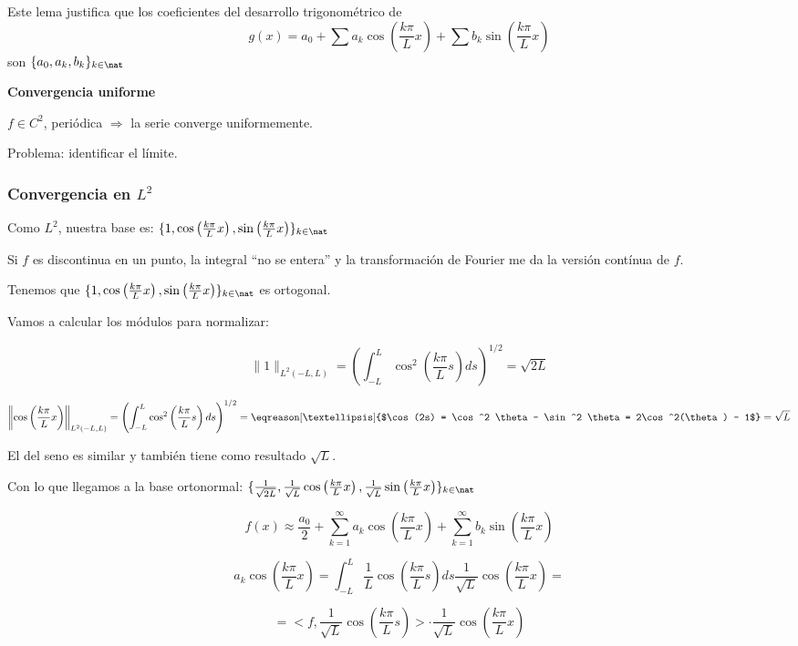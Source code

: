 		Este lema justifica que los coeficientes del desarrollo trigonométrico de$$g(x) = a_0 + \sum a_k \cos \left( \frac{k \pi}{L} x \right) + \sum b_k \sin \left( \frac{k \pi}{L} x \right) $$ son $\{a_0,a_k,b_k\}_{k \in \nat}$

		\textbf{Convergencia uniforme}

		$f \in C^2$, periódica $\Rightarrow$ la serie converge uniformemente.

		Problema: identificar el límite.

		\subsubsection{Convergencia en $L^2$}

		Como $L^2$, nuestra base es: $\{1, \cos \left( \frac{k \pi}{L} x \right), \sin \left( \frac{k \pi}{L} x \right)\}_{k \in \nat}$

		\obs Si $f$ es discontinua en un punto, la integral ``no se entera'' y la transformación de Fourier me da la versión contínua de $f$.

		Tenemos que $\{1, \cos \left( \frac{k \pi}{L} x \right), \sin \left( \frac{k \pi}{L} x \right)\}_{k \in \nat}$ es ortogonal.

		Vamos a calcular los módulos para normalizar:

		\[\|1\|_{L^2 (-L,L)} = \left( \int_{-L}^L \cos^2  \left( \frac{k \pi}{L} s \right) ds \right)^{1/2} = \sqrt{2L} \]

		\[\left\|\cos \left( \frac{k \pi}{L} x \right)\right\|_{L^2 (-L,L)} = \left( \int_{-L}^L \cos^2  \left( \frac{k \pi}{L} s \right) ds \right)^{1/2} = \eqreason[…]{$\cos(2s) = \cos^2 \theta - \sin^2 \theta = 2\cos^2(\theta) - 1$}  = \sqrt{L} \]

		El del seno es similar y también tiene como resultado $\sqrt{L}$.

		Con lo que llegamos a la base ortonormal: $\{\frac{1}{\sqrt{2L}}, \frac{1}{\sqrt{L}} \cos \left( \frac{k \pi}{L} x \right),\frac{1}{\sqrt{L}} \sin \left( \frac{k \pi}{L} x \right)\}_{k \in \nat}$


		\[ f(x) ≈ \frac{a_0}{2} + \sum_{k=1}^\infty a_k \cos \left( \frac{k \pi}{L} x \right) + \sum_{k=1}^\infty b_k \sin \left( \frac{k \pi}{L} x \right) \]

		\[ a_k \cos \left( \frac{k \pi}{L} x \right) = \int^L_{-L} \frac{1}{L} \cos \left( \frac{k \pi}{L} s \right) ds \frac{1}{\sqrt{L}} \cos \left( \frac{k \pi}{L} x \right) = \]

		\[ = < f, \frac{1}{\sqrt{L}} \cos \left( \frac{k \pi}{L} s \right)> \cdot \frac{1}{\sqrt{L}} \cos \left( \frac{k \pi}{L} x \right) \]


